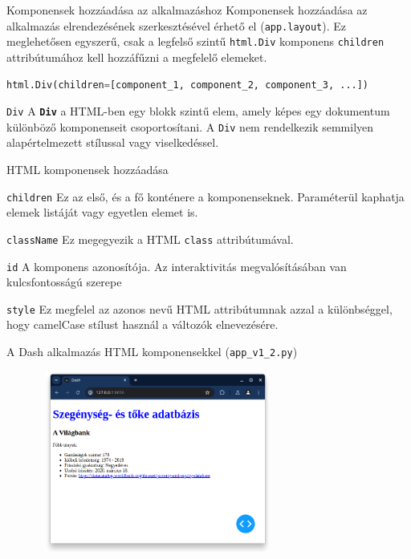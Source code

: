 \documentclass[english, aspectratio=169]{beamer}
\begin{document}
\begin{frame}[fragile]{Komponensek hozzáadása az alkalmazáshoz}
	Komponensek hozzáadása az alkalmazás elrendezésének szerkesztésével érhető el (\texttt{app.layout}). Ez meglehetősen egyszerű, csak a legfelső szintű \texttt{html.Div} komponens \texttt{children} attribútumához kell hozzáfűzni a megfelelő elemeket.\par\smallskip
	\begin{lstlisting}[language=python]
html.Div(children=[component_1, component_2, component_3, ...])
	\end{lstlisting}
	\par\smallskip
	\begin{block}{\texttt{Div}}
		A \textbf{\texttt{Div}} a HTML-ben egy blokk szintű elem, amely képes egy dokumentum különböző komponenseit csoportosítani. A \texttt{Div} nem rendelkezik semmilyen alapértelmezett stílussal vagy viselkedéssel.
	\end{block}
\end{frame}

\begin{frame}[fragile]{HTML komponensek hozzáadása}
	\begin{block}{\texttt{children}}
		Ez az első, és a fő konténere a komponenseknek. Paraméterül kaphatja elemek listáját vagy egyetlen elemet is.
	\end{block}
	\begin{block}{\texttt{className}}
		Ez megegyezik a HTML \texttt{class} attribútumával.
	\end{block}
	\begin{block}{\texttt{id}}
		A komponens azonosítója. Az interaktivitás megvalósításában van kulcsfontosságú szerepe
	\end{block}
	\begin{block}{\texttt{style}}
		Ez megfelel az azonos nevű HTML attribútumnak azzal a különbséggel, hogy camelCase stílust használ a változók elnevezésére.
	\end{block}
\end{frame}

\begin{frame}{A Dash alkalmazás HTML komponensekkel (\texttt{app\_v1\_2.py})}
	\begin{center}
		\includegraphics[width=10cm, height=6cm, keepaspectratio]{images/dash_6.png}
	\end{center}
\end{frame}
\end{document}
